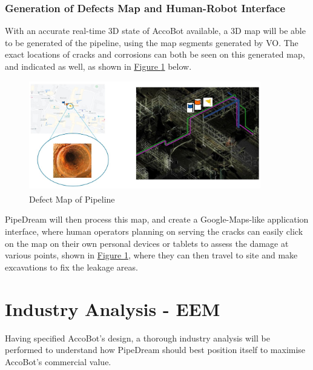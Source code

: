 \documentclass[11pt]{article}		%
\newcommand{\supercite}[1]{\textsuperscript{\cite{#1}}}		%
\newcommand{\figref}[1]{\hyperref[#1]{Figure \ref*{#1}}}    %
\begin{document}
	\subsubsection{Generation of Defects Map and Human-Robot Interface}
	With an accurate real-time 3D state of AccoBot available, a 3D map will be able to be generated of the pipeline, using the map segments generated by VO. The exact locations of cracks and corrosions can both be seen on this generated map, and indicated as well, as shown in \figref{defectMap} below.
				\begin{figure}[h]
				\centering
				\includegraphics[width=0.9\textwidth]{mapping.jpg}
				\caption{Defect Map of Pipeline\supercite{ELFTransmitter}}
				\label{defectMap}
			\end{figure}
	PipeDream will then process this map, and create a Google-Maps-like application interface, where human operators planning on serving the cracks can easily click on the map on their own personal devices or tablets to assess the damage at various points, shown in \figref{defectMap}, where they can then travel to site and make excavations to fix the leakage areas. 

	\section{Industry Analysis - EEM}
		
	Having specified AccoBot's design, a thorough industry analysis will be performed to understand how PipeDream should best position itself to maximise AccoBot's commercial value. 
		
\end{document}
